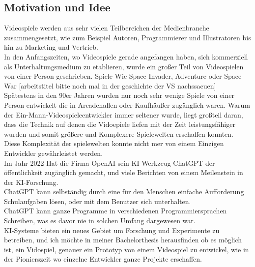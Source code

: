 \documentclass[10pt,a4paper,bibliography=totocnumbered,listof=totocnumbered]{scrartcl}
\begin{document}
\subsection{Motivation und Idee}
Videospiele werden aus sehr vielen Teilbereichen der Medienbranche zusammengesetzt, wie zum Beispiel Autoren, Programmierer und Illustratoren bis hin zu Marketing und Vertrieb.
\\
In den Anfangszeiten, wo Videospiele gerade angefangen haben, sich kommerziell als Unterhaltungsmedium zu etablieren, wurde ein großer Teil von Videospielen von einer Person geschrieben. Spiele Wie Space Invader, Adventure oder Space War [arbeitstitel bitte noch mal in der geschichte der VS nachssacuen]
\\
Spätestens in den 90er Jahren wurden nur noch sehr wenige Spiele von einer Person entwickelt die in Arcadehallen oder Kaufhäußer zugänglich waren.
Warum der Ein-Mann-Videospieleentwickler immer seltener wurde, liegt großteil daran, dass die Technik auf denen die Vidoepiele liefen mit der Zeit leistungsfähiger wurden und somit größere und Komplexere Spielewelten erschaffen konnten.
\\
Diese Komplexität der spielewelten konnte nicht mer von einem Einzigen Entwickler gewährleistet werden.
\\
Im Jahr 2022 Hat die Firma OpenAI sein KI-Werkzeug ChatGPT der öffentlichkeit zugänglich gemacht, und viele Berichten von einem Meilenstein in der KI-Forschung.
\\
ChatGPT kann selbständig durch eine für den Menschen einfache Aufforderung Schulaufgaben lösen, oder mit dem Benutzer sich unterhalten.
\\
ChatGPT kann ganze Programme in verschiedenen Programmiersprachen Schreiben, was es davor nie in solchen Umfang dargewesen war.
\\
KI-Systeme bieten ein neues Gebiet um Forschung und Experimente zu betreiben, und ich möchte in meiner Bachelorthesis herausfinden ob es möglich ist, ein Vidospiel, genauer ein Prototyp von einem Videospiel zu entwickel, wie in der Pionierszeit wo einzelne Entwickler ganze Projekte erschaffen.
\\
 
\end{document}
